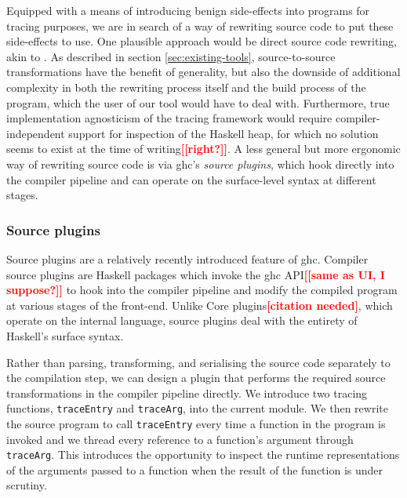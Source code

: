 \documentclass[thesis=B,english]{FITthesis}[2019/12/23]
\newcommand{\todo}[1]{\textcolor{red}{\textbf{[[#1]]}}}
\newcommand{\citationNeeded}{\textcolor{red}{\textbf{[citation needed]}}}
\newcommand{\hsIdent}[1]{\texttt{#1}}
\begin{document}
Equipped with a means of introducing benign side-effects into programs for
tracing purposes, we are in search of a way of rewriting source code to put
these side-effects to use. One plausible approach would be direct source code
rewriting, akin to . As described in section
\ref{sec:existing-tools}, source-to-source transformations have the benefit of
generality, but also the downside of additional complexity in both the
rewriting process itself and the build process of the program, which the user
of our tool would have to deal with. Furthermore, true implementation
agnosticism of the tracing framework would require compiler-independent support
for inspection of the Haskell heap, for which no solution seems to exist at the
time of writing\todo{right?}. A less general but more ergonomic way of
rewriting source code is via \acrshort{ghc}'s \textit{source plugins}, which
hook directly into the compiler pipeline and can operate on the surface-level
syntax at different stages.

\subsubsection*{Source plugins}
Source plugins\cite{ghc-source-plugins} are a relatively recently introduced
feature of \acrshort{ghc}. Compiler source plugins are Haskell packages which
invoke the \acrshort{ghc} API\todo{same as UI, I suppose?} to hook into the
compiler pipeline and modify the compiled program at various stages of the
front-end. Unlike Core plugins\citationNeeded, which operate on the internal
language, source plugins deal with the entirety of Haskell's surface syntax.

Rather than parsing, transforming, and serialising the source code separately
to the compilation step, we can design a plugin that performs the required
source transformations in the compiler pipeline directly. We introduce two
tracing functions, \hsIdent{traceEntry} and \hsIdent{traceArg}, into the
current module. We then rewrite the source program to call \hsIdent{traceEntry}
every time a function in the program is invoked and we thread every reference
to a function's argument through \hsIdent{traceArg}. This introduces the
opportunity to inspect the runtime representations of the arguments passed to a
function when the result of the function is under scrutiny.
\end{document}
